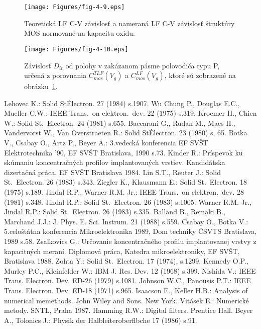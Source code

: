 \begin{figure}[h!]\centering
  \texttt{[image: Figures/fig-4-9.eps]}
  \caption[Teoretická LF C-V závislosť a nameraná LF C-V
    závislosť]{Teoretická LF C-V závislosť a nameraná LF C-V závislosť
    štruktúry MOS normované na kapacitu oxidu.}\label{fig:4.9}
\end{figure}

\begin{figure}[h!]\centering
  \texttt{[image: Figures/fig-4-10.eps]}
  \caption[Závislosť $D_{it}$ od polohy v zakázanom pásme polovodiča
    určená z porovnania $C_{mos}^{TLF}(V_{g})$ a
    $C_{mos}^{LF}(V_{g})$]{Závislosť $D_{it}$ od polohy v zakázanom
    pásme polovodiča typu P, určená z porovnania
    $C_{mos}^{TLF}(V_{g})$ a $C_{mos}^{LF}(V_{g})$, ktoré sú zobrazené
    na obrázku~\ref{fig:4.9}.}\label{fig:4.10}
\end{figure}


\begin{thebibliography}{}
 Lehovec K.: Solid St\.  Electron.  27 (1984)
  s.1907.
 Wu Chung P., Douglas E.C., Mueller C.W.: IEEE
  Trans.\ on elektron.\ dev. 22 (1975) s.319.
 Kroemer H., Chien W.: Solid St.\ Electron. 24
  (1981) s.655.
 Baccarani G., Rudan M., Maes H., Vandervorst W.,
  Van Overstraeten R.: Solid St\. Electron. 23 (1980) s. 65.
 Botka V., Csabay O., Artz P., Beyer A.: 3.vedecká
  konferencia EF SVŠT Elektrotechnika '90, EF SVŠT Bratislava, 1990
  s.73.
 Kinder R.: Príspevok ku skúmaniu koncentračných
  profilov implantovaných vrstiev. Kandidátska dizertačná práca. EF
  SVŠT Bratislava 1984.
 Lin S.T., Reuter J.: Solid St.\ Electron. 26 (1983)
  s.343.
 Ziegler K., Klausmann E.: Solid St.\ Electron. 18
  (1975) s.189.
 Jindal R.P., Warner R.M. Jr.: IEEE Trans.\ on
  elektron.\ dev. 28 (1981) s.348.
 Jindal R.P.: Solid St.\ Electron. 26 (1983)
  s.1005.
 Warner R.M. Jr., Jindal R.P.: Solid
  St.\ Electron. 26 (1983) s.335.
 Balland B., Remaki B., Marchand J.J.:
  J. Phys. E. Sci. Instrum. 21 (1988) s.559.
 Csabay O., Botka V.: 5.celoštátna konferencia
  Mikroelektronika 1989, Dom techniky ČSVTS Bratislava, 1989 s.58.
 Zsalkovics G.: Určovanie koncentračného profilu
  implantovanej vrstvy z kapacitných meraní. Diplomová práca, Katedra
  mikroelektroniky, EF SVŠT, Bratislava 1988.
 Zohta Y.: Solid St.\ Electron. 17 (1974), s.1299.
 Kennedy O.P., Murley P.C., Kleinfelder W.: IBM
  J. Res. Dev. 12 (1968) s.399.
 Nishida V.: IEEE Trans. Electron. Dev. ED-26
  (1979) s.1081.
 Johnson W.C., Panousis P.T.: IEEE
  Trans. Electron. Dev. ED-18 (1971) s.965.
 Isaacson E., Keller H.B.: Analysis of numerical
  memethods.  John Wiley and Sons. New York.
 Vitásek E.: Numerické metody. SNTL, Praha 1987.
 Hamming R.W.: Digital filters. Prentice Hall.
 Beyer A., Tolonics J.: Physik der
  Halbleiteroberflbche 17 (1986) s.91.
\end{thebibliography}
